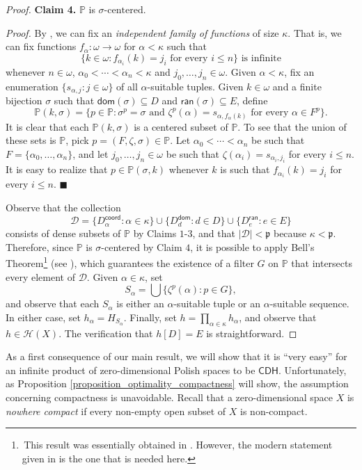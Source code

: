 \documentclass{amsart}
\theoremstyle{plain}
\theoremstyle{definition}
\newcommand{\dom}{\mathsf{dom}}
\newcommand{\ran}{\mathsf{ran}}
\newcommand{\coord}{\mathsf{coord}}
\newcommand{\CDH}{\mathsf{CDH}}
\newcommand{\DD}{\mathcal{D}}
\newcommand{\HH}{\mathcal{H}}
\newcommand{\PPP}{\mathbb{P}}
\newcommand{\pppp}{\mathfrak{p}}
\begin{document}
\begin{proof}
\noindent\textbf{Claim 4.} $\PPP$ is $\sigma\text{-}\mathrm{centered}$.

\noindent\textit{Proof.} By \cite[Exercise III.2.12]{kunen}, we can fix an \emph{independent family of functions} of size $\kappa$. That is, we can fix functions $f_\alpha:\omega\longrightarrow\omega$ for $\alpha<\kappa$ such that
$$
\{k\in\omega:f_{\alpha_i}(k)=j_i\text{ for every }i\leq n\}\text{ is infinite}
$$
whenever $n\in\omega$, $\alpha_0<\cdots <\alpha_n<\kappa$ and $j_0,\ldots ,j_n\in\omega$. Given $\alpha<\kappa$, fix an enumeration $\{s_{\alpha,j}:j\in\omega\}$ of all $\alpha$-suitable tuples. Given $k\in\omega$ and a finite bijection $\sigma$ such that $\dom(\sigma)\subseteq D$ and $\ran(\sigma)\subseteq E$, define
$$
\PPP(k,\sigma)=\{p\in\PPP:\sigma^p=\sigma\text{ and }\zeta^p(\alpha)=s_{\alpha,f_\alpha(k)}\text{ for every }\alpha\in F^p\}.
$$
It is clear that each $\PPP(k,\sigma)$ is a centered subset of $\PPP$. To see that the union of these sets is $\PPP$, pick $p=(F,\zeta,\sigma)\in\PPP$. Let $\alpha_0<\cdots <\alpha_n$ be such that $F=\{\alpha_0,\ldots,\alpha_n\}$, and let $j_0,\ldots ,j_n\in\omega$ be such that $\zeta(\alpha_i)=s_{\alpha_i,j_i}$ for every $i\leq n$. It is easy to realize that $p\in\PPP(\sigma,k)$ whenever $k$ is such that $f_{\alpha_i}(k)=j_i$ for every $i\leq n$. $\blacksquare$

Observe that the collection
$$
\DD=\{D^\coord_\alpha:\alpha\in\kappa\}\cup\{D^\dom_d:d\in D\}\cup\{D^\ran_e:e\in E\}
$$
consists of dense subsets of $\PPP$ by Claims $1$-$3$, and that $|\DD|<\pppp$ because $\kappa<\pppp$. Therefore, since $\PPP$ is $\sigma$-centered by Claim $4$, it is possible to apply Bell's Theorem\footnote{\,This result was essentially obtained in \cite{bell}. However, the modern statement given in \cite{kunen} is the one that is needed here.} (see \cite[Theorem III.3.61]{kunen}), which guarantees the existence of a filter $G$ on $\PPP$ that intersects every element of $\DD$. Given $\alpha\in\kappa$, set
$$
S_\alpha =\bigcup\{\zeta^p(\alpha):p\in G\},
$$
and observe that each $S_\alpha$ is either an $\alpha$-suitable tuple or an $\alpha$-suitable sequence. In either case, set $h_\alpha=H_{S_\alpha}$. Finally, set $h=\prod_{\alpha\in\kappa}h_\alpha$, and observe that $h\in\HH(X)$. The verification that $h[D]=E$ is straightforward.
\end{proof}

As a first consequence of our main result, we will show that it is ``very easy'' for an infinite product of zero-dimensional Polish spaces to be $\CDH$. Unfortunately, as Proposition \ref{proposition_optimality_compactness} will show, the assumption concerning compactness is unavoidable. Recall that a zero-dimensional space $X$ is \emph{nowhere compact} if every non-empty open subset of $X$ is non-compact.
\end{document}
